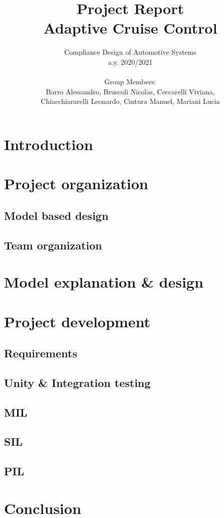 \documentclass[12pt,a4paper]{report}
\begin{document}
	
	\author{Compliance Design of Automotive Systems \\
		a.y. 2020/2021\\\\
		Group Members:\\
		Barro Alessandro, Bruscoli Nicolas, Ceccarelli Viviana, \\
		Chiacchiararelli Leonardo, Cintura Manuel, Mariani Lucia\\
	}
	\title{Project Report\\
		Adaptive Cruise Control
	}
	\maketitle
	
\tableofcontents
\listoffigures

\chapter{Introduction}

\chapter{Project organization}

\section{Model based design}
\section{Team organization}


\chapter{Model explanation \& design}

\chapter{Project development}

\section{Requirements}
\section{Unity \& Integration testing}
\section{MIL}
\section{SIL}
\section{PIL}


\chapter{Conclusion}
	
	
\end{document}

